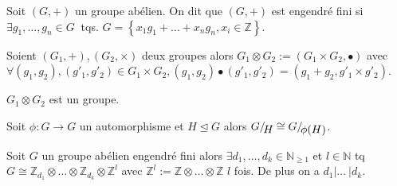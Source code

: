         \begin{definition}
    \label{def:494}
    Soit $(G,+)$ un groupe abélien. On dit que $(G,+)$ est engendré fini si $\exists g_1,\dots,g_n \in G\ $ tqs. $G= \left\{ x_1g_1+\dots+x_ng_n, x_i \in \mathbb{Z} \right\} $.
        \end{definition}
        
        
          \begin{definition}
    \label{def:495}
    Soient $(G_1,+), (G_2,\times)$ deux groupes alors $G_1\otimes G_2 :=(G_1\times G_2, \bullet )$ avec $\forall (g_1,g_2), (g'_1,g'_2) \in G_1\times G_2, (g_1,g_2)\bullet (g'_1,g'_2)= (g_1+g_2, g'_1 \times g'_2)$.
    \end{definition}
    
        \begin{remark}
        \label{rem:2}
         $G_1\otimes G_2$ est un groupe.
        \end{remark}
        
        
         \begin{lemma}

    Soit $\phi:G\rightarrow G$ un automorphisme et $H\unlhd G$ alors $ G/\!\raisebox{-.65ex}{\ensuremath{{H}}} \cong G/\!\raisebox{-.65ex}{\ensuremath{{ \phi (H)}}}$.
    \end{lemma}
        
          \begin{theorem}
    Soit $G$ un groupe abélien engendré fini alors $\exists d_1,\dots,d_k \in \mathbb{N}_{ \ge 1}$ et $l\in \mathbb{N}$ tq $G  \cong \mathbb{Z}_{d_1} \otimes \dots \otimes \mathbb{Z}_{d_k} \otimes \mathbb{Z}^l$ avec $\mathbb{Z}^l:=\mathbb{Z} \otimes \dots 
   \otimes \mathbb{Z}$ $l$ fois. De plus on a $d_1|\dots\ |d_k$.
    \end{theorem}
    
